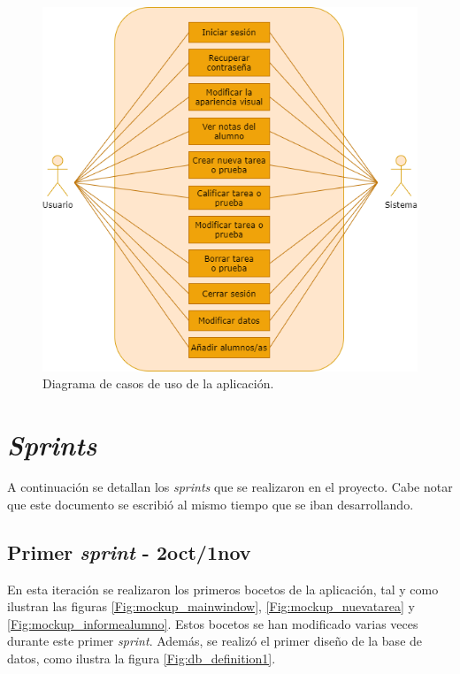 \begin{figure}[h]
\centering\includegraphics[width=1\linewidth]{figs/diagramacdu.png}
\caption{Diagrama de casos de uso de la aplicación.}
\label{Fig:diagramacdu}
\end{figure}

\section{\textit{Sprints}}

A continuación se detallan los \textit{sprints} que se realizaron en el proyecto. Cabe notar que este documento se escribió al mismo tiempo que se iban desarrollando.

\subsection{Primer \textit{sprint} - 2oct/1nov}

En esta iteración se realizaron los primeros bocetos de la aplicación, tal y como ilustran las figuras \ref{Fig:mockup_mainwindow}, \ref{Fig:mockup_nuevatarea} y \ref{Fig:mockup_informealumno}. Estos bocetos se han modificado varias veces durante este primer \textit{sprint}. Además, se realizó el primer diseño de la base de datos, como ilustra la figura \ref{Fig:db_definition1}.

